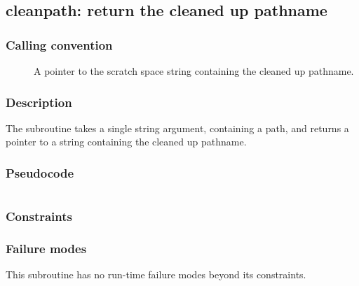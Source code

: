 \clearpage
{}
{}
\label{subr:cleanpath}
\subsection*{cleanpath: return the cleaned up pathname}

\subsubsection*{Calling convention}

\begin{description}
\item[] A pointer to the scratch space string containing the
	cleaned up pathname.
\end{description}

\subsubsection*{Description}

The  subroutine takes a single string argument, containing
a path, and returns a pointer to a string containing the cleaned up pathname.

\subsubsection*{Pseudocode}

\begin{verbatim}
\end{verbatim}

\subsubsection*{Constraints}

\subsubsection*{Failure modes}

This subroutine has no run-time failure modes beyond its constraints.
